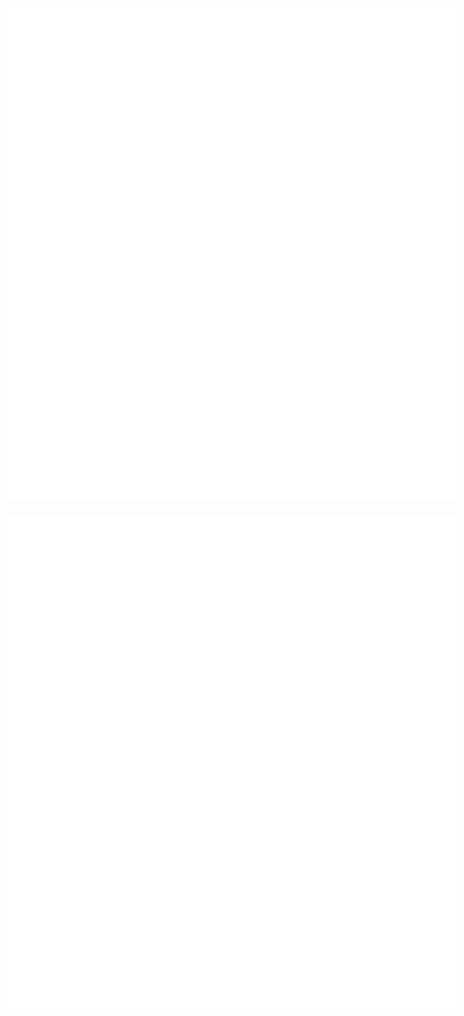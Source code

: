\documentclass[fleqn]{ingenuitylabs-slides}
\begin{document}
\SlideBlue 
\begin{frame}
    \centering
    \includegraphics[height=0.9\textheight]{figs/ingenuitylabs-logo-white.pdf}
\end{frame}


\SlideRed
\begin{frame}
    \centering
    \includegraphics[height=0.9\textheight]{figs/ingenuitylabs-logo-white.pdf}
\end{frame}
\end{document}
